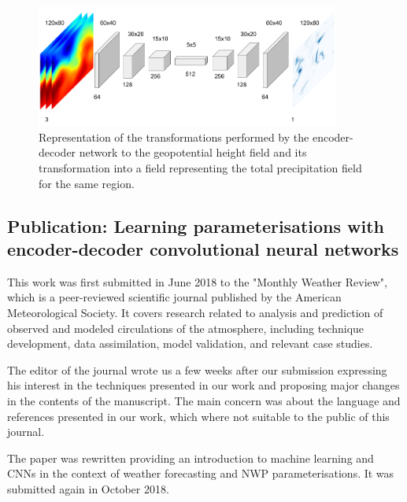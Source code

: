 \medskip

\begin{figure}[h]
 \centerline{\includegraphics[width=10cm]{paper4.png}}\caption{Representation of the transformations performed by the encoder-decoder network to the geopotential height field and its transformation into a field representing the total precipitation field for the same region.}\label{paper4}
\end{figure}

\subsection{Publication: Learning parameterisations with encoder-decoder convolutional neural networks}

This work was first submitted in June 2018 to the "Monthly Weather Review", which is a peer-reviewed scientific journal published by the American Meteorological Society. It covers research related to analysis and prediction of observed and modeled circulations of the atmosphere, including technique development, data assimilation, model validation, and relevant case studies.

\medskip

The editor of the journal wrote us a few weeks after our submission expressing his interest in the techniques presented in our work and proposing major changes in the contents of the manuscript. The main concern was about the language and references presented in our work, which where not suitable to the public of this journal. 

\medskip

The paper was rewritten providing an introduction to machine learning and CNNs in the context of weather forecasting and NWP parameterisations. It was submitted again in October 2018.

